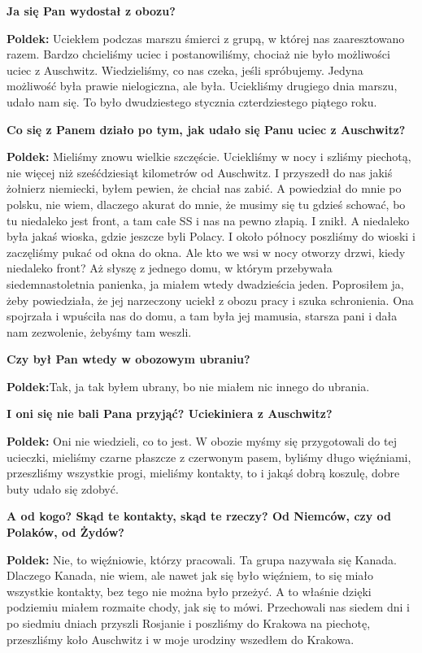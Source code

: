 \textbf{Ja się Pan wydostał z obozu?}\par 
\textbf{Poldek:} Uciekłem podczas marszu śmierci z grupą, w której nas zaaresztowano razem.  Bardzo chcieliśmy uciec i postanowiliśmy, chociaż nie było możliwości uciec z Auschwitz. Wiedzieliśmy, co nas czeka, jeśli spróbujemy. Jedyna możliwość była prawie nielogiczna, ale była. Uciekliśmy drugiego dnia marszu, udało nam się. To było dwudziestego stycznia czterdziestego piątego roku.\par
\textbf{Co się z Panem działo po tym, jak udało się Panu uciec z Auschwitz?}\par
\textbf{Poldek:} Mieliśmy znowu wielkie szczęście. Uciekliśmy w nocy i szliśmy piechotą, nie więcej niż sześćdziesiąt kilometrów od Auschwitz. I przyszedł do nas jakiś żołnierz niemiecki, byłem pewien, że chciał nas zabić. A powiedział do mnie po polsku, nie wiem, dlaczego akurat do mnie, że musimy się tu gdzieś schować, bo tu niedaleko jest front, a tam całe SS i nas na pewno złapią. I znikł. A niedaleko była jakaś wioska, gdzie jeszcze byli Polacy. I około północy poszliśmy do wioski i zaczęliśmy pukać od okna do okna. Ale kto we wsi w nocy otworzy drzwi, kiedy niedaleko front? Aż słyszę z jednego domu, w którym przebywała siedemnastoletnia panienka, ja miałem wtedy dwadzieścia jeden. Poprosiłem ja, żeby powiedziała, że jej narzeczony uciekł z obozu pracy i szuka schronienia. Ona spojrzała i wpuściła nas do domu, a tam była jej mamusia, starsza pani i dała nam zezwolenie, żebyśmy tam weszli.\par 
\textbf{Czy był Pan wtedy w obozowym ubraniu?}\par
\textbf{Poldek:}Tak, ja tak byłem ubrany, bo nie miałem nic innego do ubrania.\par  
\textbf{I oni się nie bali Pana przyjąć? Uciekiniera z Auschwitz?}\par
\textbf{Poldek:} Oni nie wiedzieli, co to jest. W obozie myśmy się przygotowali do tej ucieczki, mieliśmy czarne płaszcze z czerwonym pasem, byliśmy długo więźniami, przeszliśmy wszystkie progi, mieliśmy kontakty, to i jakąś dobrą koszulę, dobre buty udało się zdobyć.\par 
\textbf{A od kogo? Skąd te kontakty, skąd te rzeczy? Od Niemców, czy od Polaków, od Żydów?}\par 
\textbf{Poldek:} Nie, to więźniowie, którzy pracowali. Ta grupa nazywała się Kanada. Dlaczego Kanada, nie wiem, ale nawet jak się było więźniem, to się miało wszystkie kontakty, bez tego nie można było przeżyć. A to właśnie dzięki podziemiu miałem rozmaite chody, jak się to mówi. Przechowali nas siedem dni i po siedmiu dniach przyszli Rosjanie i poszliśmy do Krakowa na piechotę, przeszliśmy koło Auschwitz i w moje urodziny wszedłem do Krakowa.\par 
